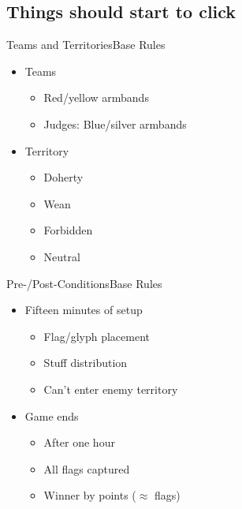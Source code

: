 \documentclass[17pt]{beamer}
\newcommand{\flavortext}[1]{}
\begin{document}
\subsection{Things should start to click}

\begin{frame}{Teams and Territories}{Base Rules}
  \begin{itemize}
  \item Teams
    \begin{itemize}
    \item Red/yellow armbands
    \item Judges: Blue/silver armbands
    \end{itemize}
  \item Territory
    \begin{itemize}
    \item Doherty
    \item Wean
    \item Forbidden
    \item Neutral
    \end{itemize}
  \end{itemize}
\end{frame}

\begin{frame}{Pre-/Post-Conditions}{Base Rules}
  \begin{itemize}
  \item Fifteen minutes of setup
    \begin{itemize}
    \item Flag/glyph placement
    \item Stuff distribution
    \item Can't enter enemy territory
    \end{itemize}
  \item Game ends
    \begin{itemize}
    \item After one hour
    \item All flags captured
    \item Winner by points ($\approx$ flags)
    \end{itemize}
  \end{itemize}
\end{frame}
\end{document}
